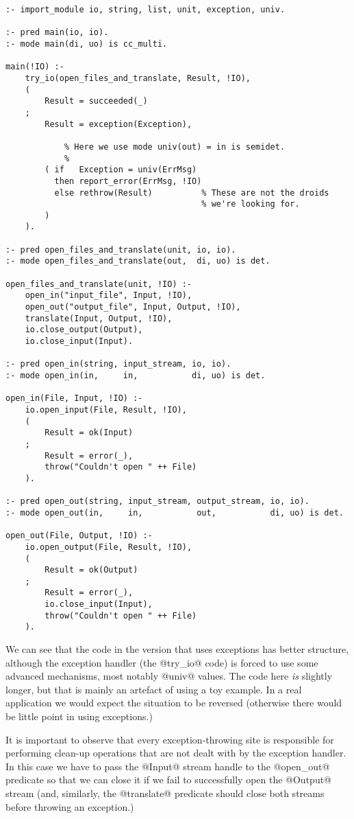 \begin{verbatim}
:- import_module io, string, list, unit, exception, univ.

:- pred main(io, io).
:- mode main(di, uo) is cc_multi.

main(!IO) :-
    try_io(open_files_and_translate, Result, !IO),
    (
        Result = succeeded(_)
    ;
        Result = exception(Exception),

            % Here we use mode univ(out) = in is semidet.
            %
        ( if   Exception = univ(ErrMsg)
          then report_error(ErrMsg, !IO)
          else rethrow(Result)          % These are not the droids
                                        % we're looking for.
        )
    ).

:- pred open_files_and_translate(unit, io, io).
:- mode open_files_and_translate(out,  di, uo) is det.

open_files_and_translate(unit, !IO) :-
    open_in("input_file", Input, !IO),
    open_out("output_file", Input, Output, !IO),
    translate(Input, Output, !IO),
    io.close_output(Output),
    io.close_input(Input).

:- pred open_in(string, input_stream, io, io).
:- mode open_in(in,     in,           di, uo) is det.

open_in(File, Input, !IO) :-
    io.open_input(File, Result, !IO),
    (
        Result = ok(Input)
    ;
        Result = error(_),
        throw("Couldn't open " ++ File)
    ).

:- pred open_out(string, input_stream, output_stream, io, io).
:- mode open_out(in,     in,           out,           di, uo) is det.

open_out(File, Output, !IO) :-
    io.open_output(File, Result, !IO),
    (
        Result = ok(Output)
    ;
        Result = error(_),
        io.close_input(Input),
        throw("Couldn't open " ++ File)
    ).
\end{verbatim}
We can see that the code in the version that uses exceptions has
better structure, although the exception handler (the @try_io@ code) is
forced to use some advanced mechanisms, most notably @univ@ values.  The
code here \emph{is} slightly longer, but that is mainly an artefact of
using a toy example.  In a real application we would expect the
situation to be reversed (otherwise there would be little point in using
exceptions.)

It is important to observe that every exception-throwing site is
responsible for performing clean-up operations that are not dealt with
by the exception handler.  In this case we have to pass the @Input@
stream handle to the @open_out@ predicate so that we can close it if we
fail to successfully open the @Output@ stream (and, similarly, the
@translate@ predicate should close both streams before throwing an
exception.)



